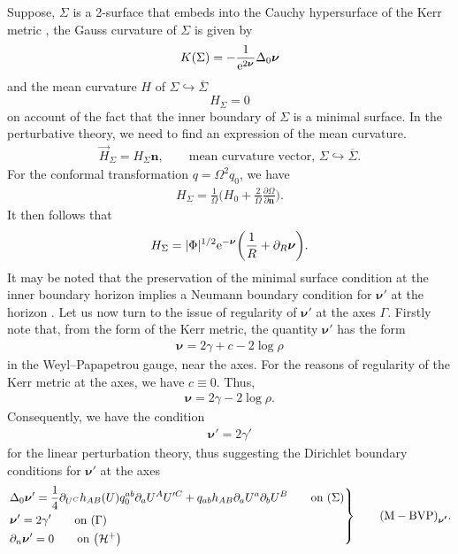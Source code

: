 \documentclass[pdftex]{sigma}
\def\ptl{\partial}%
\def\mbo#1{\boldsymbol{#1}}%
\def\olin#1{\overline{#1}{}}%
\numberwithin{equation}{section}
\begin{document}
Suppose, $\Sigma$ is a 2-surface that embeds into the Cauchy hypersurface of the Kerr metric \smash{$(\Sigma \hookrightarrow) \olin{\Sigma}$}, the Gauss curvature of $\Sigma$ is given by
\begin{align*}
K (\Sigma) = - \frac{1}{{\rm e}^{2 \mbo{\nu}}} \Delta_0 \mbo{\nu}
\end{align*}
and the mean curvature $H$ of $\Sigma \hookrightarrow \olin{\Sigma}$
\[
H_\Sigma = 0
\]
on account of the fact that the inner boundary of $\Sigma$ is a minimal surface. In the perturbative theory, we need to find an expression of the mean curvature.
\begin{align*}
\vec{H}_{\Sigma} = H_{\Sigma} \mbo{n}, \qquad \text{mean curvature vector, $\Sigma \hookrightarrow \olin{\Sigma}$}.
\end{align*}
For the conformal transformation $q= \Omega^2 q_0$, we have
\begin{align*}
H_\Sigma = \frac{1}{\Omega} \biggl(H_0 + \frac{2}{\Omega} \frac{ \ptl \Omega}{\ptl \mbo{n}} \biggr).
\end{align*}
It then follows that
\begin{align*}
H_{\Sigma} = \vert \Phi \vert^{1/2} {\rm e}^{-\mbo{\nu}} \biggl(\frac{1}{R} + \ptl_R \mbo{\nu}
\biggr).
\end{align*}
It may be noted that the preservation of the minimal surface condition at the inner boundary horizon  implies a Neumann boundary condition for $\mbo{\nu}'$ at the horizon .
Let us now turn to the issue of regularity of $\mbo{\nu}'$ at the axes $\Gamma$. Firstly note that, from the form of the Kerr metric, the quantity $\mbo{\nu}'$ has the form
\begin{align*}
\mbo{\nu} = 2\gamma + c - 2 \log \rho
\end{align*}
in the Weyl--Papapetrou gauge, near the axes. For the reasons of regularity of the Kerr metric at the axes, we have $c \equiv 0$. Thus,
\begin{align*}
\mbo{\nu} = 2 \gamma - 2 \log \rho.
\end{align*}
Consequently, we have the condition
\begin{align} \label{gamma-nu condition}
\mbo{\nu}' = 2 \gamma'
\end{align}
for the linear perturbation theory, thus suggesting the Dirichlet boundary conditions for $\mbo{\nu}'$ at the axes
\begin{equation*}
\left.\begin{aligned}
&\Delta_0 \mbo{\nu}'=\frac{1}{4} \ptl_{U^C} h_{AB}(U) q^{ab}_{0} \ptl_a U^A U'^C + q_{ab} h_{AB} \ptl_a U^a \ptl_b U^B \qquad \text{on}\ (\Sigma)\\
&\mbo{\nu}' = 2\gamma' \qquad \text{on} \ (\Gamma) \\
&\ptl_n \mbo{\nu}'=0 \qquad \text{on} \ \bigl(\mathcal{H}^{+}\bigr)
\end{aligned}
 \right\}
\qquad {\rm (M-BVP)}_{\mbo{\nu'}}.
\end{equation*}
\end{document}
